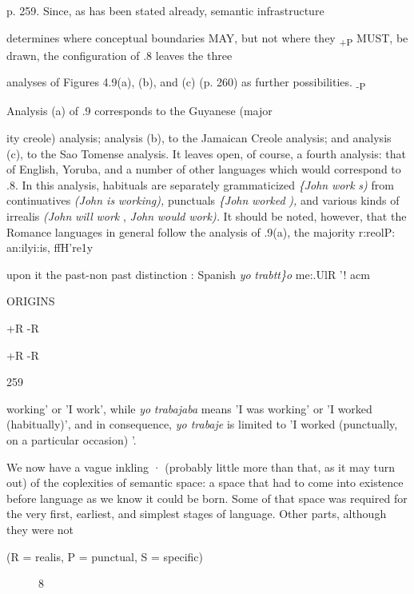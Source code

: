 p. 259. Since, as has been stated already, semantic infrastructure

determines where conceptual boundaries MAY, but not where they \textsubscript{+P }MUST, be drawn, the configuration of .8 leaves the three

analyses of Figures 4.9(a), (b), and (c) (p. 260) as further possibilities. \textsubscript{{}-}\textsubscript{P}

Analysis (a) of .9 corresponds to the Guyanese (major\-

ity creole) analysis; analysis (b), to the Jamaican Creole analysis; and analysis (c), to the Sao Tomense analysis. It leaves open, of course, a fourth analysis: that of English, Yoruba, and a number of other languages which would correspond to .8. In this analysis, habituals are separately grammaticized \textit{\{John} \textit{work} \textit{s)} from continua\-tives \textit{(John is} \textit{workin}\textit{g}\textit{), }punctuals \textit{\{John} \textit{worked} \textit{), }and various kinds of irrealis \textit{(John} \textit{will} \textit{work} , \textit{John} \textit{would} \textit{wor}\textit{k}\textit{).} It should be noted, however, that the Romance languages in general follow the analysis of .9(a), the majority r:reolP: an:ilyi:is, ffH're1y   


 \textsubscript{ }upon it the past-non past distinction : Spanish \textit{yo }\textit{trabtt\}o }me:.UlR '! acm

ORIGINS

+R -R 

+R -R

259

working' or 'I work', while \textit{yo} \textit{trabajaba} means 'I was working' or 'I worked (habitually)', and in consequence, \textit{yo trabaje} is limited to 'I worked (punctually, on a particular occasion) '.

We now have a vague inkling · (probably little more than that, as it may turn out) of the coplexities of semantic space: a space that had to come into existence before language as we know it could be born. Some of that space was required for the very first, earliest, and simplest stages of language. Other parts, although they were not

(R = realis, P = punctual, S = specific)

\begin{figure}
\caption{8}
\label{fig:4}
\end{figure}

